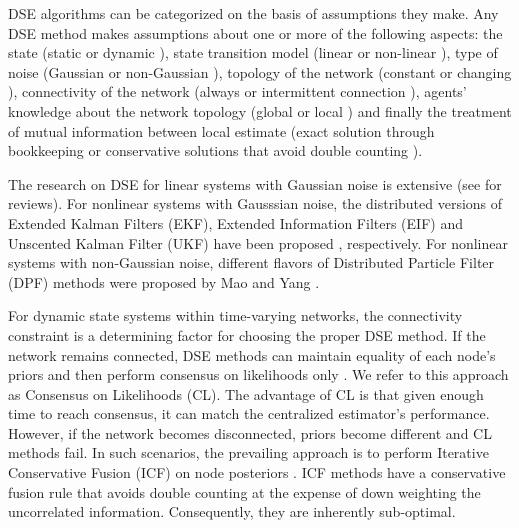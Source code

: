 \documentclass[conference]{IEEEtran}
\theoremstyle{remark}
\begin{document}
DSE algorithms can be categorized on the basis of assumptions they make. Any 
DSE method makes assumptions about one or more of the following aspects: the 
state (static \cite{xiao2005scheme} or dynamic \cite{5509143}), state 
transition model (linear \cite{olfati2005distributed} or non-linear 
\cite{battistelli2014parallel,rao2003constrained,boem2013distributed,hu2014state}),
 type of noise (Gaussian 
\cite{xiao2005scheme,olfati2005distributed} or non-Gaussian 
\cite{hlinka2013distributed}), topology of the network (constant or changing 
\cite{tamjidi2016unifying,xiao2005scheme}), connectivity of the network (always 
\cite{battistelli2014parallel} or intermittent connection 
\cite{tamjidi2016unifying,xiao2005scheme}), agents' knowledge about the network 
topology (global or local 
\cite{tamjidi2016unifying,xiao2005scheme,battistelli2014parallel}) and finally 
the treatment of  mutual information between local estimate (exact solution 
through bookkeeping \cite{durrant2001data} or conservative  solutions that 
avoid double counting \cite{wang_distr_CI,hu2012diffusion}).

The research on DSE for linear systems with Gaussian noise is extensive (see 
\cite{olfati2005distributed,cattivelli2010diffusion} for reviews). For 
nonlinear systems with Gausssian noise, the distributed versions of Extended 
Kalman Filters (EKF), Extended Information Filters (EIF) and Unscented Kalman 
Filter (UKF) have been proposed  
\cite{battistelli2016stability,dist_inf_filter_2009,battistelli2014parallel}, 
respectively. For nonlinear systems with non-Gaussian noise, different flavors 
of Distributed Particle Filter (DPF) methods were proposed by Mao and Yang
\cite{lin_dist_part_filter_2014}. 

For dynamic state systems within time-varying networks, the connectivity constraint is a determining factor for 
choosing the proper DSE method. If the network remains connected, DSE methods 
can maintain equality of each node's priors and then perform consensus on likelihoods only 
\cite{hlinka2012likelihood,li2012distributed}. We refer to this approach as 
Consensus on Likelihoods (CL). The advantage of CL is that given enough time to 
reach consensus, it can match the centralized estimator's performance. However, 
if the network becomes disconnected, priors become different and CL methods 
fail. In such scenarios, the prevailing  approach is to perform Iterative 
Conservative Fusion (ICF) on node posteriors 
\cite{battistelli2014kullback,wang_distr_CI,hu2012diffusion}. ICF methods have a conservative fusion rule that 
avoids double counting at the expense of down weighting the uncorrelated 
information. Consequently, they are inherently sub-optimal.
\end{document}
